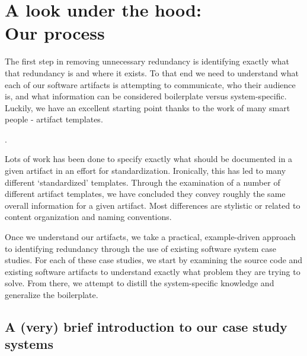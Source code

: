 \chapter{A look under the hood: \\ Our process}
\label{c:process}



The first step in removing unnecessary redundancy is identifying exactly what
that redundancy is and where it exists. To that end we need to understand what
each of our software artifacts is attempting to communicate, who their audience
is, and what information can be considered boilerplate versus system-specific.
Luckily, we have an excellent starting point thanks to the work of many smart
people - artifact templates.

.


Lots of work  has been done to specify 
exactly what should be documented in a given artifact in an effort for 
standardization. Ironically, this has led to many different `standardized' 
templates. Through the examination of a number of different artifact templates, 
we have concluded they convey roughly the same overall information for a given 
artifact. Most differences are stylistic or related to content 
organization and naming conventions.

Once we understand our artifacts, we take a practical, example-driven approach
to identifying redundancy through the use of existing software system case
studies. For each of these case studies, we start by examining the source code
and existing software artifacts to understand exactly what problem they are
trying to solve. From there, we attempt to distill the system-specific knowledge
and generalize the boilerplate.

\section{A (very) brief introduction to our case study systems}

